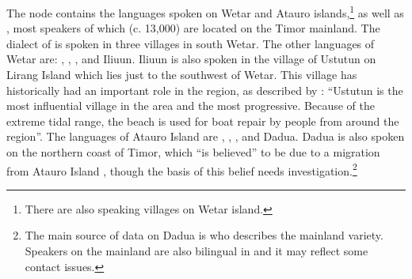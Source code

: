 The  node contains the languages spoken on
Wetar and Atauro islands,\footnote{
		There are also  speaking villages
		on Wetar island.}
as well as ,
most speakers of which (c.
13,000) are located on the Timor mainland.
The  dialect of  is spoken in three villages in south Wetar.
The other languages of Wetar are: ,
, , and Ili{\Q}uun.
Ili{\Q}uun is also spoken in the village of Ustutun on Lirang
Island which lies just to the southwest of Wetar.
This village has historically had an important role in the region,
as described by \citet[114]{Hinton2000}: “Ustutun is the most
influential village in the area
and the most progressive.
Because of the extreme tidal range,
the beach is used for boat repair by people from around the region”.
The languages of Atauro Island are ,
, , and Dadu{\Q}a.
Dadu{\Q}a is also spoken on the northern coast of Timor,
which “is believed” to be due to a migration from Atauro Island
\citep[4]{Penn2006}, though the basis of this belief needs investigation.\footnote{
		The main source of data on Dadu{\Q}a is \citet{Penn2006} who describes the mainland variety.
		Speakers on the mainland are also bilingual in 
		and it may reflect some contact issues.}

